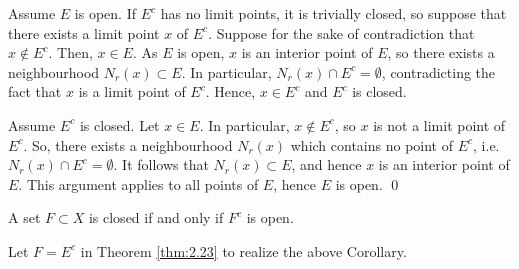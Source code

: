 \begin{nproof}
    \boxed{\implies} Assume $E$ is open. If $E^c$ has no limit points, it is trivially closed, so suppose that there exists a limit point $x$ of $E^c$. Suppose for the sake of contradiction that $x \notin E^c$. Then, $x \in E$. As $E$ is open, $x$ is an interior point of $E$, so there exists a neighbourhood $N_r(x) \subset E$. In particular, $N_r(x) \cap E^c = \emptyset$, contradicting the fact that $x$ is a limit point of $E^c$. Hence, $x \in E^c$ and $E^c$ is closed.

    \boxed{\impliedby} Assume $E^c$ is closed. Let $x \in E$. In particular, $x \notin E^c$, so $x$ is not a limit point of $E^c$. So, there exists a neighbourhood $N_r(x)$ which contains no point of $E^c$, i.e. $N_r(x) \cap E^c = \emptyset$. It follows that $N_r(x) \subset E$, and hence $x$ is an interior point of $E$. This argument applies to all points of $E$, hence $E$ is open. \qed
\end{nproof}

\begin{ncorollary}{}{}
    A set $F \subset X$ is closed if and only if $F^c$ is open.
\end{ncorollary}
\noindent Let $F = E^c$ in Theorem \ref{thm:2.23} to realize the above Corollary.


